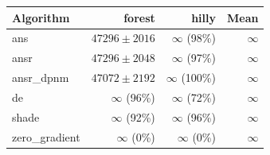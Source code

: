 \begin{tabular}{lrrr}
\toprule
Algorithm & forest & hilly & Mean \\
\midrule
ans & $47296 \pm 2016$ & $\infty$ (98\%) & $\infty$ \\
ansr & $47296 \pm 2048$ & $\infty$ (97\%) & $\infty$ \\
ansr\_dpnm & $47072 \pm 2192$ & $\infty$ (100\%) & $\infty$ \\
de & $\infty$ (96\%) & $\infty$ (72\%) & $\infty$ \\
shade & $\infty$ (92\%) & $\infty$ (96\%) & $\infty$ \\
zero\_gradient & $\infty$ (0\%) & $\infty$ (0\%) & $\infty$ \\
\bottomrule
\end{tabular}
